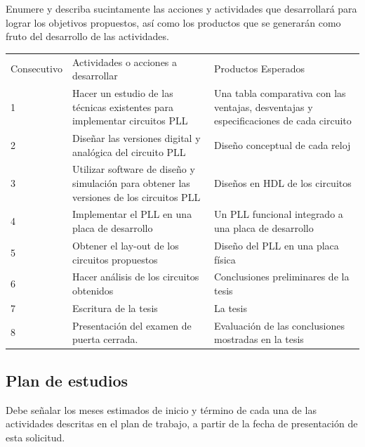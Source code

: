 \documentclass[runningheads,a4paper]{llncs}
\begin{document}
Enumere y describa sucintamente las acciones y actividades que desarrollará para lograr los objetivos propuestos, así como los productos que se generarán como fruto del desarrollo de las actividades. 
\begin{table}
\begin{center}
\begin{tabular}{|p{2cm}|p{5cm}|p{5cm}|} 
\hline\noalign{\smallskip}
Consecutivo & Actividades o acciones a desarrollar & Productos Esperados\\

\noalign{\smallskip}
\hline
\noalign{\smallskip}
1& Hacer un estudio de las técnicas existentes para implementar circuitos PLL & Una tabla comparativa con las ventajas, desventajas y especificaciones de cada circuito \\\hline
2&Diseñar las versiones digital y analógica del circuito PLL & Diseño conceptual de cada reloj \\\hline
3&Utilizar software de diseño y simulación para obtener las versiones de los circuitos PLL & Diseños en HDL de los circuitos\\\hline
4&Implementar el PLL en una placa de desarrollo & Un PLL funcional integrado a una placa de desarrollo \\\hline
5&Obtener el lay-out de los circuitos propuestos & Diseño del PLL en una placa física \\\hline
6&Hacer análisis de los circuitos obtenidos & Conclusiones preliminares de la tesis\\\hline
7&Escritura de la tesis & La tesis \\\hline
8&Presentación del examen de puerta cerrada. & Evaluación de las conclusiones mostradas en la tesis \\\hline
\end{tabular}
\end{center}
\end{table}

\subsection{Plan de estudios }
Debe señalar los meses estimados de inicio y término de cada una de las actividades descritas en el plan de trabajo, a partir de la fecha de presentación de esta solicitud.
\end{document}
